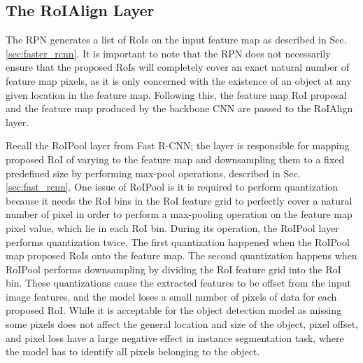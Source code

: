 \subsection{The RoIAlign Layer}

The RPN generates a list of RoIs on the input feature map as described in Sec. \ref{sec:faster_rcnn}. It is important to note that the RPN does not necessarily ensure that the proposed RoIs will completely cover an exact natural number of feature map pixels, as it is only concerned with the existence of an object at any given location in the feature map. Following this, the feature map RoI proposal and the feature map produced by the backbone CNN are passed to the RoIAlign layer. 

Recall the RoIPool layer from Fast R-CNN; the layer is responsible for mapping proposed RoI of varying to the feature map and downsampling them to a fixed predefined size by performing max-pool operations, described in Sec. \ref{sec:fast_rcnn}. One issue of RoIPool is it is required to perform quantization because it needs the RoI bins in the RoI feature grid to perfectly cover a natural number of pixel in order to perform a max-pooling operation on the feature map pixel value, which lie in each RoI bin. During its operation, the RoIPool layer performs quantization twice. The first quantization happened when the RoIPool map proposed RoIs onto the feature map. The second quantization happens when RoIPool performs downsampling by dividing the RoI feature grid into the RoI bin. These quantizations cause the extracted features to be offset from the input image features, and the model loses a small number of pixels of data for each proposed RoI. While it is acceptable for the object detection model as missing some pixels does not affect the general location and size of the object, pixel offset, and pixel loss have a large negative effect in instance segmentation task, where the model has to identify all pixels belonging to the object.

